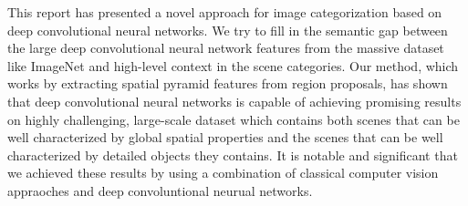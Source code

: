 
This report has presented a novel approach for image categorization based on
deep convolutional neural networks. We try to fill in the semantic gap between
the large deep convolutional neural network features from the massive dataset
like ImageNet and high-level context in the scene categories. Our method, which
works by extracting spatial pyramid features from region proposals, has shown
that deep convolutional neural networks is capable of achieving promising
results on highly challenging, large-scale dataset which contains both scenes
that can be well characterized by global spatial properties and the scenes that
can be well characterized by detailed objects they contains.
It is notable and significant that we achieved these results by using a
combination of classical computer vision appraoches and deep convoluntional
neurual networks.
